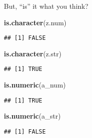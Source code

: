 \documentclass[ignorenonframetext,]{beamer}
\newenvironment{Shaded}{\begin{snugshade}}{\end{snugshade}}
\newcommand{\KeywordTok}[1]{\textcolor[rgb]{0.13,0.29,0.53}{\textbf{#1}}}
\newcommand{\NormalTok}[1]{#1}
\begin{document}
\begin{frame}[fragile]{But, ``is'' it what you think?}

\begin{Shaded}
\begin{Highlighting}[]
\KeywordTok{is.character}\NormalTok{(z.num)}
\end{Highlighting}
\end{Shaded}

\begin{verbatim}
## [1] FALSE
\end{verbatim}

\begin{Shaded}
\begin{Highlighting}[]
\KeywordTok{is.character}\NormalTok{(z.str)}
\end{Highlighting}
\end{Shaded}

\begin{verbatim}
## [1] TRUE
\end{verbatim}

\begin{Shaded}
\begin{Highlighting}[]
\KeywordTok{is.numeric}\NormalTok{(a_num)}
\end{Highlighting}
\end{Shaded}

\begin{verbatim}
## [1] TRUE
\end{verbatim}

\begin{Shaded}
\begin{Highlighting}[]
\KeywordTok{is.numeric}\NormalTok{(a_str)}
\end{Highlighting}
\end{Shaded}

\begin{verbatim}
## [1] FALSE
\end{verbatim}

\end{frame}
\end{document}
